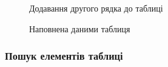 \documentclass[a4paper,14pt]{extarticle} %
\begin{document}
\begin{figure}[H]
    \begin{minipage}[H]{1\linewidth}
    \end{minipage}
    \vfill
    \begin{minipage}[H]{1\linewidth}
        \caption{Додавання другого рядка до таблиці}
        \label{fig:add second item AWS CLI}
    \end{minipage}
\end{figure}

\begin{figure}[H]
    \caption{Наповнена даними таблиця}
    \label{fig:creation finished AWS CLI}
\end{figure}

\subsubsection*{Пошук елементів таблиці}
\end{document}
